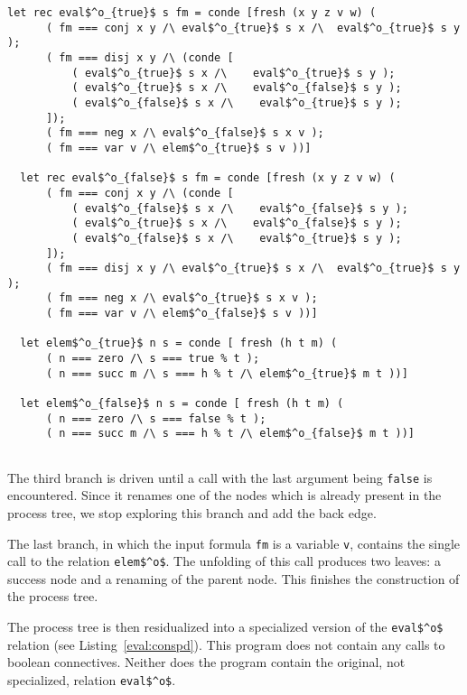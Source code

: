 \begin{figure*}[!t]
  \centering
  \begin{minipage}{0.65\textwidth}
    \begin{lstlisting}[label={eval:conspd}, caption={Specialized evaluator of propositional formulas}, captionpos=b, frame=tb]
  let rec eval$^o_{true}$ s fm = conde [fresh (x y z v w) (
      ( fm === conj x y /\ eval$^o_{true}$ s x /\  eval$^o_{true}$ s y );
      ( fm === disj x y /\ (conde [
          ( eval$^o_{true}$ s x /\    eval$^o_{true}$ s y );
          ( eval$^o_{true}$ s x /\    eval$^o_{false}$ s y );
          ( eval$^o_{false}$ s x /\    eval$^o_{true}$ s y );
      ]);
      ( fm === neg x /\ eval$^o_{false}$ s x v );
      ( fm === var v /\ elem$^o_{true}$ s v ))]

  let rec eval$^o_{false}$ s fm = conde [fresh (x y z v w) (
      ( fm === conj x y /\ (conde [
          ( eval$^o_{false}$ s x /\    eval$^o_{false}$ s y );
          ( eval$^o_{true}$ s x /\    eval$^o_{false}$ s y );
          ( eval$^o_{false}$ s x /\    eval$^o_{true}$ s y );
      ]);
      ( fm === disj x y /\ eval$^o_{true}$ s x /\  eval$^o_{true}$ s y );
      ( fm === neg x /\ eval$^o_{true}$ s x v );
      ( fm === var v /\ elem$^o_{false}$ s v ))]

  let elem$^o_{true}$ n s = conde [ fresh (h t m) (
      ( n === zero /\ s === true % t );
      ( n === succ m /\ s === h % t /\ elem$^o_{true}$ m t ))]

  let elem$^o_{false}$ n s = conde [ fresh (h t m) (
      ( n === zero /\ s === false % t );
      ( n === succ m /\ s === h % t /\ elem$^o_{false}$ m t ))]


    \end{lstlisting}
  \end{minipage}
\end{figure*}

The third branch is driven until a call with the last argument being \lstinline{false} is encountered.
Since it renames one of the nodes which is already present in the process tree, we stop exploring this branch and add the back edge.

The last branch, in which the input formula \lstinline{fm} is a variable \lstinline{v}, contains the single call to the relation \lstinline{elem$^o$}.
The unfolding of this call produces two leaves: a success node and a renaming of the parent node.
This finishes the construction of the process tree.

The process tree is then residualized into a specialized version of the \lstinline{eval$^o$} relation (see Listing~\ref{eval:conspd}).
This program does not contain any calls to boolean connectives.
Neither does the program contain the original, not specialized, relation \lstinline{eval$^o$}.

